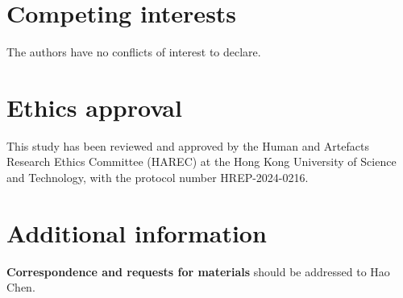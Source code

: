 \section*{Competing interests}\label{sec5-1}
The authors have no conflicts of
interest to declare.

\section*{Ethics approval}\label{sec5-1}
This study has been reviewed and approved by the Human and Artefacts Research Ethics Committee (HAREC) at the Hong Kong University of Science and Technology, with the protocol number HREP-2024-0216.

\section*{Additional information}\label{sec5-1}

\textbf{Correspondence and requests for materials} should be addressed to Hao Chen.
